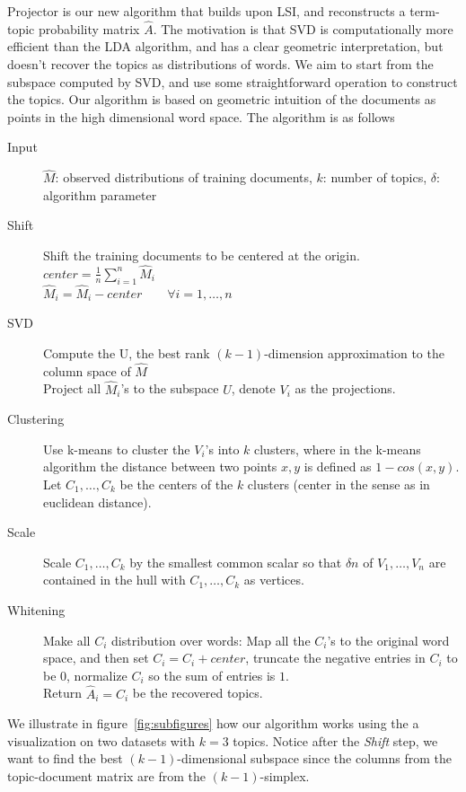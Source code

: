 Projector is our new algorithm that builds upon LSI, and reconstructs
a term-topic probability matrix $\hat{A}$. The motivation is that SVD
is computationally more efficient than the LDA algorithm, and has a
clear geometric interpretation, but doesn't recover the topics as
distributions of words. We aim to start from the subspace computed by
SVD, and use some straightforward operation to construct the
topics. Our algorithm is based on geometric intuition of the documents
as points in the high dimensional word space. The algorithm is as
follows
\begin{description}
	\item[Input] $\hat{M}$: observed distributions of training documents, $k$: number of topics, $\delta$: algorithm parameter
	\item[Shift] Shift the training documents to be centered at the origin.\\
			     $center=\frac{1}{n}\sum_{i=1}^n\hat{M}_i$\\
			     $\hat{M}_i=\hat{M}_i-center\qquad \forall i=1,\ldots,n$
	\item[SVD] Compute the U, the best rank $(k-1)$-dimension approximation to the column space of $\hat{M}$\\
                                 Project all $\hat{M}_i$'s to the subspace $U$, denote $V_i$ as the projections.
	\item[Clustering] Use k-means to cluster the $V_i$'s into $k$ clusters, where in the k-means algorithm the distance between two points $x,y$ is defined as $1-cos(x,y)$.\\
				      Let $C_1,\ldots,C_k$ be the centers of the $k$ clusters (center in the sense as in euclidean distance).
	\item[Scale] Scale $C_1,\ldots,C_k$ by the smallest common scalar so that $\delta n$ of $V_1,\ldots,V_n$ are contained in the hull with $C_1,\ldots,C_k$ as vertices. 
	\item[Whitening] Make all $C_i$ distribution over words: Map all the $C_i$'s to the original word space, and then set $C_i=C_i+center$, truncate the negative entries in $C_i$ to be $0$, normalize $C_i$ so the sum of entries is $1$.\\
                                            Return $\hat{A}_i=C_i$ be the recovered topics.
\end{description}
We illustrate in figure~\ref{fig:subfigures} how our algorithm works
using the a visualization on two datasets with $k=3$
topics. Notice after the {\em Shift} step, we want to find the best
$(k-1)$-dimensional subspace since the columns from the topic-document
matrix are from the $(k-1)$-simplex.

